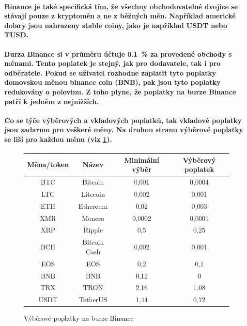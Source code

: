 \documentclass[thesis=B,czech]{FITthesis}[2019/03/21]
\begin{document}
\paragraph{
Binance je také specifická tím, že všechny obchodovatelné dvojice se stávají pouze z kryptoměn a ne z běžných měn. Například americké dolary jsou nahrazeny stable coiny, jako je například USDT nebo TUSD. 
}
\paragraph{
Burza Binance si v průměru účtuje 0.1~\% za provedené obchody s měnami. Tento poplatek je stejný, jak pro dodavatele, tak i pro odběratele. Pokud se uživatel rozhodne zaplatit tyto poplatky domovskou měnou binance coin (BNB), pak jsou tyto poplatky redukovány o polovinu. Z toho plyne, že poplatky na burze Binance patří k jedněm z nejnižších.
}
\paragraph{
Co se týče výběrových a vkladových poplatků, tak vkladové poplatky jsou zadarmo pro veškeré měny. Na druhou stranu výběrové poplatky se liší pro každou měnu (viz \ref{binance_fees}). \cite{blockonomi_binance}
}
\begin{figure}\centering
    \begin{center}
     \begin{tabular}{||c | c | c | c||} 
     \hline
     Měna/token & Název & Minimální výběr & Výběrový poplatek \\ [0.5ex] 
     \hline\hline
     BTC & Bitcoin & 0,001 & 0,0004 \\ 
     \hline
     LTC & Litecoin & 0,002 & 0,001 \\
     \hline
     ETH & Ethereum & 0,02 & 0,003 \\
     \hline
     XMR & Monero & 0,0002 & 0,0001 \\
     \hline
     XRP & Ripple & 0,5 & 0,25 \\
     \hline
     BCH & Bitcoin Cash & 0,002 & 0,001 \\
     \hline
     EOS & EOS & 0,2 & 0,1 \\
     \hline
     BNB & BNB & 0,12 & 0 \\
     \hline
     TRX & TRON & 2,16 & 1,08 \\
     \hline
     USDT & TetherUS & 1,44 & 0,72 \\ [1ex] 
     \hline
    \end{tabular}
    \end{center}
    \caption{Výběrové poplatky na burze Binance \cite{binance_fees}}
    \label{binance_fees}
\end{figure}
\end{document}
